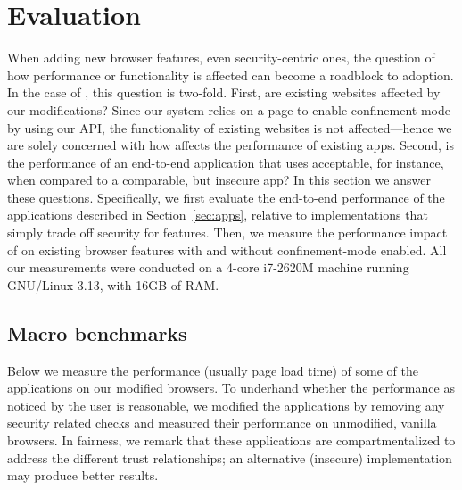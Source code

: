 \section{Evaluation}
\label{sec:eval}

When adding new browser features, even security-centric ones, the
question of how performance or functionality is affected can become a
roadblock to adoption.
%
In the case of \sys{}, this question is two-fold.
%
First, are existing websites affected by our modifications?
%
Since our system relies on a page to enable confinement mode by using
our API, the functionality of existing websites is not
affected---hence we are solely concerned with how \sys{} affects the
performance of existing apps.
%
Second, is the performance of an end-to-end application that uses
\sys{} acceptable, for instance, when compared to a comparable, but
insecure app?
%
In this section we answer these questions.
%
Specifically, we first evaluate the end-to-end performance of the
applications described in Section~\ref{sec:apps}, relative to
implementations that simply trade off security for features.
%
Then, we measure the performance impact of \sys{} on existing browser
features with and without confinement-mode enabled.
%
All our measurements were conducted on a 4-core i7-2620M machine
running GNU/Linux 3.13, with 16GB of RAM.
%


\subsection{Macro benchmarks}
\label{sec:eval:macro}

Below we measure the performance (usually page load time) of some of
the applications on our modified browsers.
%
To underhand whether the performance as noticed by the user is
reasonable, we modified the applications by removing any security
related checks and measured their performance on unmodified, vanilla
browsers.
%
In fairness, we remark that these applications are compartmentalized
to address the different trust relationships; an alternative
(insecure) implementation may produce better results.

